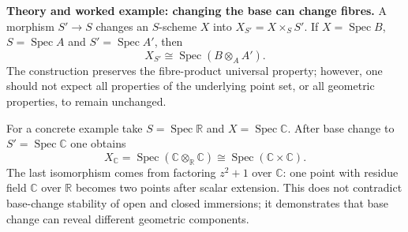 \noindent\textbf{Theory and worked example: changing the base can change fibres.}
A morphism $S'\to S$ changes an $S$-scheme $X$ into
$X_{S'}=X\times_S S'$. If $X=\operatorname{Spec}B$,
$S=\operatorname{Spec}A$ and $S'=\operatorname{Spec}A'$, then
\[
X_{S'}\cong\operatorname{Spec}(B\otimes_A A').
\]
The construction preserves the fibre-product universal property;
however, one should not expect all properties of the underlying point
set, or all geometric properties, to remain unchanged.

For a concrete example take $S=\operatorname{Spec}\mathbb R$ and
$X=\operatorname{Spec}\mathbb C$. After base change to
$S'=\operatorname{Spec}\mathbb C$ one obtains
\[
X_{\mathbb C}=\operatorname{Spec}
(\mathbb C\otimes_{\mathbb R}\mathbb C)
\cong\operatorname{Spec}(\mathbb C\times\mathbb C).
\]
The last isomorphism comes from factoring $z^2+1$ over $\mathbb C$:
one point with residue field $\mathbb C$ over $\mathbb R$ becomes two
points after scalar extension. This does not contradict base-change
stability of open and closed immersions; it demonstrates that base
change can reveal different geometric components.

\medskip
